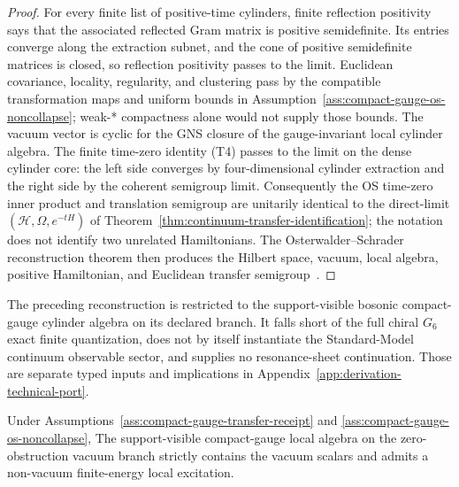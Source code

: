 \begin{proof}
For every finite list of positive-time cylinders, finite reflection positivity says that the
associated reflected Gram matrix is positive semidefinite. Its entries converge along the
extraction subnet, and the cone of positive semidefinite matrices is closed, so reflection
positivity passes to the limit. Euclidean covariance, locality, regularity, and clustering pass by
the compatible transformation maps and uniform bounds in
Assumption~\ref{ass:compact-gauge-os-noncollapse}; weak-* compactness alone would not supply those
bounds. The vacuum vector is cyclic for the GNS closure of the gauge-invariant local cylinder
algebra. The finite time-zero identity (T4) passes to the limit on the dense cylinder core:
the left side converges by four-dimensional cylinder extraction and the right side by the coherent
semigroup limit. Consequently the OS time-zero inner product and translation semigroup are
unitarily identical to the direct-limit \((\mathcal H,\Omega,e^{-tH})\) of
Theorem~\ref{thm:continuum-transfer-identification}; the notation does not identify two unrelated
Hamiltonians. The
Osterwalder--Schrader reconstruction theorem then produces the Hilbert space, vacuum, local
algebra, positive Hamiltonian, and Euclidean transfer semigroup~\cite{osterwalderSchrader73,
osterwalderSchrader75}.
\end{proof}

\begin{remark}
The preceding reconstruction is restricted to the support-visible bosonic
compact-gauge cylinder algebra on its declared branch. It falls short of the full
chiral \(G_6\) exact finite quantization, does not by itself instantiate the
Standard-Model continuum observable sector, and supplies no resonance-sheet
continuation. Those are separate typed inputs and implications in
Appendix~\ref{app:derivation-technical-port}.
\end{remark}

\begin{proposition}
\label{prop:compact-gauge-nontriviality-yang-mills}
Under Assumptions~\ref{ass:compact-gauge-transfer-receipt} and
\ref{ass:compact-gauge-os-noncollapse},
The support-visible compact-gauge local algebra on the zero-obstruction vacuum branch strictly
contains the vacuum scalars and admits a non-vacuum finite-energy local excitation.
\end{proposition}

